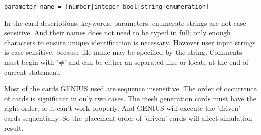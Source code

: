 \par
\begin{lstlisting}[basicstyle={\footnotesize\ttfamily},language=IDL]
parameter_name = [number|integer|bool|string|enumeration]
\end{lstlisting}
In the card descriptions, keywords, parameters, enumerate strings are not case sensitive. And their names
        does not need to be typed in full; only enough characters to ensure unique identification is necessary. However
        user input strings is case sensitive, because file name may be specified by the string. Comments must begin with
        '\#' and can be either an separated line or locate at the end of current statement.
\par
{}Most of the cards GENIUS used are sequence insensitive. The order of occurrence of cards is significant
          in only two cases. The mesh generation cards must have the right order, or it can't work properly. And GENIUS
          will execute the 'driven' cards sequentially. So the placement order of 'driven' cards will affect simulation
          result.

